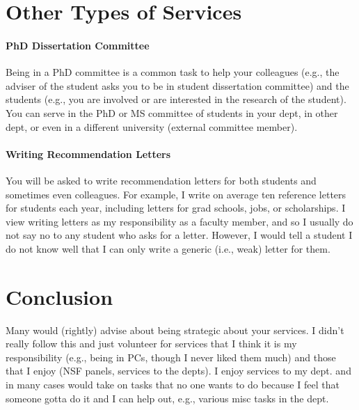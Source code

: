 \documentclass[oneside,11pt,dvipsnames]{book}
\begin{document}
\section{Other Types of Services}

\paragraph{PhD Dissertation Committee} Being in a PhD committee is a common task to help your colleagues (e.g., the adviser of the student asks you to be in student dissertation committee) and the students (e.g., you are involved or are interested in the research of the student).  You can serve in the PhD or MS committee of students in your dept, in other dept, or even in a different university (external committee member).

\paragraph{Writing Recommendation Letters} You will be asked to write recommendation letters for both students and sometimes even colleagues. For example, I write on average ten reference letters for students each year, including letters for grad schools, jobs, or scholarships. I view writing letters as my responsibility as a faculty member, and so I usually do not say no to any student who asks for a letter. However, I would tell a student I do not know well that I can only write a generic  (i.e., weak) letter for them. 


\section{Conclusion}

Many would (rightly) advise about being strategic about your services. I didn't really follow this and just volunteer for services that I think it is my responsibility (e.g., being in PCs, though I never liked them much) and those that I enjoy (NSF panels, services to the depts). I enjoy services to my dept. and in many cases would take on tasks that no one wants to do because I feel that someone gotta do it and I can help out, e.g., various misc tasks in the dept.


\end{document}
